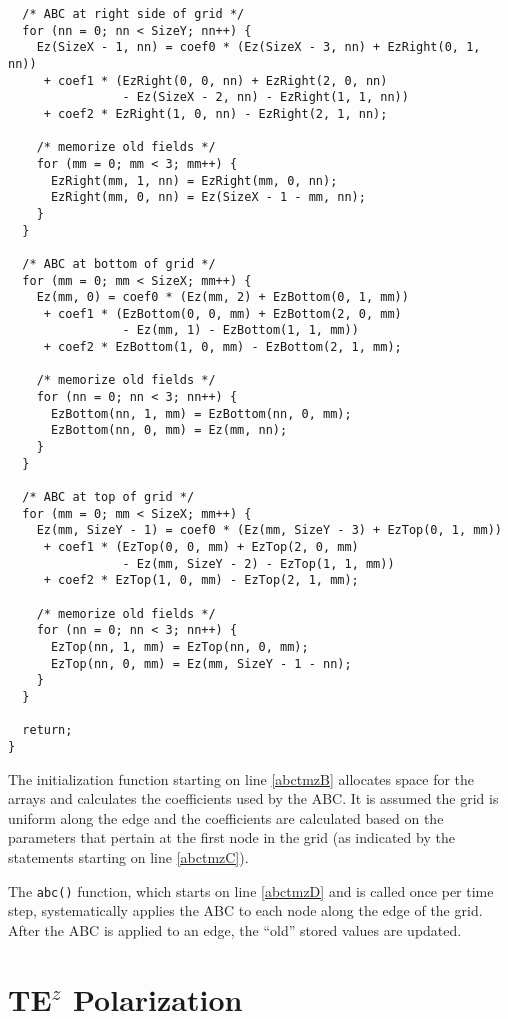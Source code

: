\begin{program}
\begin{lstlisting}
  /* ABC at right side of grid */
  for (nn = 0; nn < SizeY; nn++) {
    Ez(SizeX - 1, nn) = coef0 * (Ez(SizeX - 3, nn) + EzRight(0, 1, nn))
     + coef1 * (EzRight(0, 0, nn) + EzRight(2, 0, nn)
                - Ez(SizeX - 2, nn) - EzRight(1, 1, nn))
     + coef2 * EzRight(1, 0, nn) - EzRight(2, 1, nn);
  
    /* memorize old fields */
    for (mm = 0; mm < 3; mm++) {
      EzRight(mm, 1, nn) = EzRight(mm, 0, nn);
      EzRight(mm, 0, nn) = Ez(SizeX - 1 - mm, nn);
    }
  }

  /* ABC at bottom of grid */
  for (mm = 0; mm < SizeX; mm++) {
    Ez(mm, 0) = coef0 * (Ez(mm, 2) + EzBottom(0, 1, mm))
     + coef1 * (EzBottom(0, 0, mm) + EzBottom(2, 0, mm)
                - Ez(mm, 1) - EzBottom(1, 1, mm))
     + coef2 * EzBottom(1, 0, mm) - EzBottom(2, 1, mm);

    /* memorize old fields */ 
    for (nn = 0; nn < 3; nn++) {
      EzBottom(nn, 1, mm) = EzBottom(nn, 0, mm);
      EzBottom(nn, 0, mm) = Ez(mm, nn);
    }
  }
  
  /* ABC at top of grid */
  for (mm = 0; mm < SizeX; mm++) {
    Ez(mm, SizeY - 1) = coef0 * (Ez(mm, SizeY - 3) + EzTop(0, 1, mm))
     + coef1 * (EzTop(0, 0, mm) + EzTop(2, 0, mm)
                - Ez(mm, SizeY - 2) - EzTop(1, 1, mm))
     + coef2 * EzTop(1, 0, mm) - EzTop(2, 1, mm);
  
    /* memorize old fields */
    for (nn = 0; nn < 3; nn++) {
      EzTop(nn, 1, mm) = EzTop(nn, 0, mm);
      EzTop(nn, 0, mm) = Ez(mm, SizeY - 1 - nn);
    }
  }

  return;
}
\end{lstlisting}
\end{program}

The initialization function starting on line \ref{abctmzB} allocates
space for the arrays and calculates the coefficients used by the ABC.
It is assumed the grid is uniform along the edge and the coefficients
are calculated based on the parameters that pertain at the first node
in the grid (as indicated by the statements starting on line \ref{abctmzC}).

The {\tt abc()} function, which starts on line \ref{abctmzD} and is
called once per time step, systematically applies the ABC to each node
along the edge of the grid.  After the ABC is applied to an edge, the
``old'' stored values are updated.


\section{TE$^z$ Polarization}


